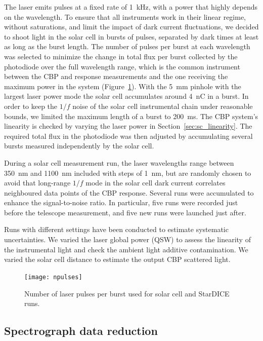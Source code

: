 The laser emits pulses at a fixed rate of \SI{1}{\kilo\hertz}, with a power that highly depends on the wavelength. To ensure that all instruments work in their linear regime, without saturations, and limit the impact of dark current fluctuations, we decided to shoot light in the solar cell in bursts of pulses, separated by dark times at least as long as the burst length. The number of pulses per burst at each wavelength was selected to minimize the change in total flux per burst collected by the photodiode over the full wavelength range, which is the common instrument between the CBP and \SD response measurements and the one receiving the maximum power in the system (Figure~\ref{fig:npulses}). With the \SI{5}{\mm} pinhole with the largest laser power mode the solar cell accumulates around \SI{4}{\nano\coulomb} in a burst. In order to keep the $1/f$ noise of the solar cell instrumental chain under reasonable bounds, we limited the maximum length of a burst to \SI{200}{\ms}. The CBP system's linearity is checked by varying the laser power in Section~\ref{sec:sc_linearity}.  The required total flux in the photodiode was then adjusted by accumulating several bursts measured independently by the solar cell.

During a solar cell measurement run, the laser wavelengths range between \SI{350}{\nano\meter} and \SI{1100}{\nano\meter} included with steps of \SI{1}{\nm}, but are randomly chosen to avoid that long-range $ 1/f$ mode in the solar cell dark current correlates neighboured data points of the CBP response. Several runs were accumulated to enhance the signal-to-noise ratio. In particular, five runs were recorded just before the \SD telescope measurement, and five new runs were launched just after.

Runs with different settings have been conducted to estimate systematic uncertainties. We varied the laser global power (QSW) to assess the linearity of the instrumental light and check the ambient light additive contamination. We varied the solar cell distance to estimate the output CBP scattered light.

\begin{figure}[!h]
\centering
\texttt{[image: npulses]}
\caption{Number of laser pulses per burst used for solar cell and StarDICE runs.}\label{fig:npulses}
\end{figure}

\subsection{Spectrograph data reduction}
\label{sec:spectro_reduction}


